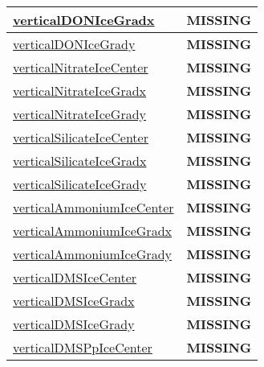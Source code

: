 {\begin{center}
\begin{longtable}{| p{2.0in} | p{4.0in} |}
    \hline
    \hyperref[subsec:var_sec_tracer_reconstruction_verticalDONIceGradx]{verticalDONIceGradx} & {\bf \color{red} MISSING} \\
    \hline
    \hyperref[subsec:var_sec_tracer_reconstruction_verticalDONIceGrady]{verticalDONIceGrady} & {\bf \color{red} MISSING} \\
    \hline
    \hyperref[subsec:var_sec_tracer_reconstruction_verticalNitrateIceCenter]{verticalNitrateIceCenter} & {\bf \color{red} MISSING} \\
    \hline
    \hyperref[subsec:var_sec_tracer_reconstruction_verticalNitrateIceGradx]{verticalNitrateIceGradx} & {\bf \color{red} MISSING} \\
    \hline
    \hyperref[subsec:var_sec_tracer_reconstruction_verticalNitrateIceGrady]{verticalNitrateIceGrady} & {\bf \color{red} MISSING} \\
    \hline
    \hyperref[subsec:var_sec_tracer_reconstruction_verticalSilicateIceCenter]{verticalSilicateIceCenter} & {\bf \color{red} MISSING} \\
    \hline
    \hyperref[subsec:var_sec_tracer_reconstruction_verticalSilicateIceGradx]{verticalSilicateIceGradx} & {\bf \color{red} MISSING} \\
    \hline
    \hyperref[subsec:var_sec_tracer_reconstruction_verticalSilicateIceGrady]{verticalSilicateIceGrady} & {\bf \color{red} MISSING} \\
    \hline
    \hyperref[subsec:var_sec_tracer_reconstruction_verticalAmmoniumIceCenter]{verticalAmmoniumIceCenter} & {\bf \color{red} MISSING} \\
    \hline
    \hyperref[subsec:var_sec_tracer_reconstruction_verticalAmmoniumIceGradx]{verticalAmmoniumIceGradx} & {\bf \color{red} MISSING} \\
    \hline
    \hyperref[subsec:var_sec_tracer_reconstruction_verticalAmmoniumIceGrady]{verticalAmmoniumIceGrady} & {\bf \color{red} MISSING} \\
    \hline
    \hyperref[subsec:var_sec_tracer_reconstruction_verticalDMSIceCenter]{verticalDMSIceCenter} & {\bf \color{red} MISSING} \\
    \hline
    \hyperref[subsec:var_sec_tracer_reconstruction_verticalDMSIceGradx]{verticalDMSIceGradx} & {\bf \color{red} MISSING} \\
    \hline
    \hyperref[subsec:var_sec_tracer_reconstruction_verticalDMSIceGrady]{verticalDMSIceGrady} & {\bf \color{red} MISSING} \\
    \hline
    \hyperref[subsec:var_sec_tracer_reconstruction_verticalDMSPpIceCenter]{verticalDMSPpIceCenter} & {\bf \color{red} MISSING} \\

\end{longtable}
\end{center}}
